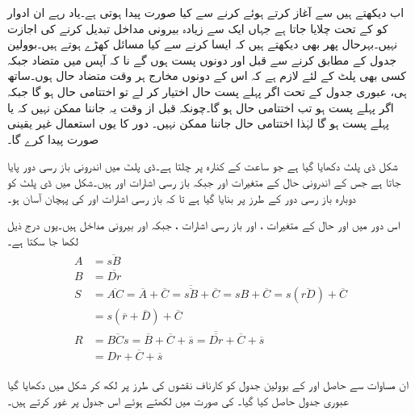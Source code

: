 اب دیکھتے ہیں  سے آغاز کرتے ہوئے  کرنے سے کیا صورت پیدا ہوتی ہے۔یاد رہے ان ادوار کو کے تحت چلایا جاتا ہے جہاں ایک سے زیادہ بیرونی مداخل تبدیل کرنے کی اجازت نہیں۔بہرحال پھر بھی دیکھتے ہیں کہ ایسا کرنے سے کیا مسائل کھڑے ہوتے ہیں۔بوولین جدول کے مطابق کرنے سے قبل  اور  دونوں پست ہوں گے نا کہ آپس میں متضاد جبکہ کسی بھی پلٹ کے لئے لازم ہے کہ اس کے دونوں مخارج ہر وقت متضاد حال ہوں۔ساتھ ہی، عبوری جدول کے تحت اگر پہلے پست حال اختیار کر لے تو اختتامی حال  ہو گا جبکہ اگر  پہلے پست ہو تب اختتامی حال  ہو گا۔چونکہ قبل از وقت یہ جاننا ممکن نہیں کہ  یا  پہلے پست ہو گا لہٰذا اختتامی حال جاننا ممکن نہیں۔ دور کا یوں استعمال غیر یقینی صورت پیدا کرے گا۔


شکل  ڈی پلٹ دکھایا گیا ہے جو ساعت کے کنارہ پر چلتا ہے۔ڈی پلٹ میں اندرونی باز رسی دور پایا جاتا ہے جس کے اندرونی حال کے متغیرات  اور  جبکہ باز رسی اشارات  اور  ہیں۔شکل میں ڈی پلٹ کو دوبارہ باز رسی دور کے طرز پر بنایا گیا ہے تا کہ باز رسی اشارات  اور  کی پہچان آسان ہو۔

اس دور میں  اور  حال کے متغیرات ،  اور  باز رسی اشارات ، جبکہ  اور  بیرونی مداخل ہیں۔یوں درج ذیل لکھا جا سکتا ہے۔
\begin{gather}
\begin{aligned}
A&=\overline{sB}\\
B&=\overline{Dr}\\
S&=\overline{AC}=\overline{A}+\overline{C}=\overline{\overline{sB}}+\overline{C}=sB+\overline{C}=s(\overline{rD})+\overline{C}\\
&=s(\overline{r}+\overline{D})+\overline{C}\\
R&=\overline{BCs}=\overline{B}+\overline{C}+\overline{s}=\overline{\overline{Dr}}+\overline{C}+\overline{s}\\
&=Dr+\overline{C}+\overline{s}
\end{aligned}
\end{gather}

 ان مساوات سے حاصل  اور  کے بوولین جدول کو کارناف نقشوں کی طرز پر لکھ کر شکل میں دکھایا گیا عبوری جدول حاصل کیا گیا۔  کی صورت میں لکھتے ہوئے اس جدول پر غور کرتے ہیں۔



